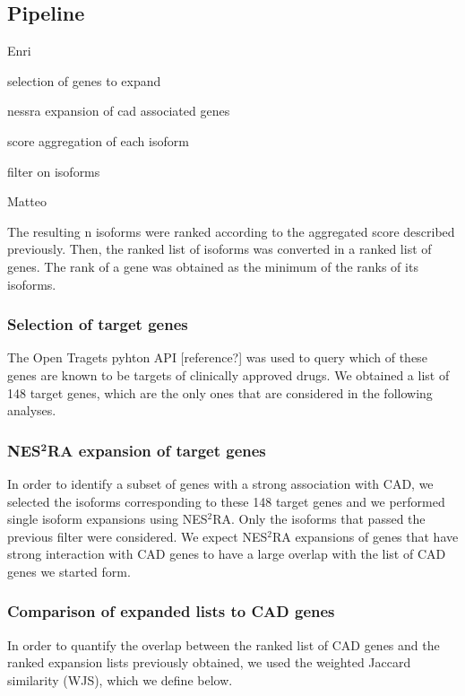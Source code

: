 \documentclass[fleqn,10pt]{SelfArx} %
\begin{document}
\subsection*{Pipeline}


Enri

selection of genes to expand

nessra expansion of cad associated genes

score aggregation of each isoform

filter on isoforms

Matteo

The resulting n isoforms were ranked according to the aggregated score described previously. Then, the ranked list of isoforms was converted in a ranked list of genes. The rank of a gene was obtained as the minimum of the ranks of its isoforms.

\subsubsection{Selection of target genes}

The Open Tragets pyhton API [reference?] was used to query which of these genes are known to be targets of clinically approved drugs. We obtained a list of 148 target genes, which are the only ones that are considered in the following analyses.

\subsubsection{NES$^{\textbf{2}}$RA expansion of target genes}

In order to identify a subset of genes with a strong association with CAD, we selected the isoforms corresponding to these 148 target genes and we performed single isoform expansions using NES$^2$RA. Only the isoforms that passed the previous filter were considered. We expect NES$^2$RA expansions of genes that have strong interaction with CAD genes to have a large overlap with the list of CAD genes we started form.

\subsubsection{Comparison of expanded lists to CAD genes}

In order to quantify the overlap between the ranked list of CAD genes and the ranked expansion lists previously obtained, we used the weighted Jaccard similarity (WJS), which we define below.\medskip
\end{document}
